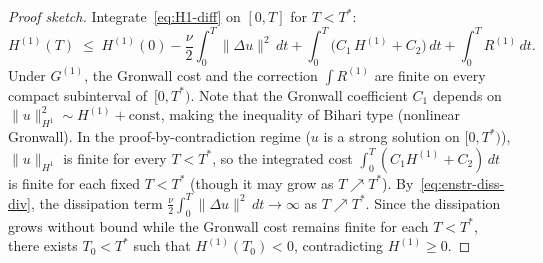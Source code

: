 \documentclass[12pt,a4paper]{article}
\theoremstyle{definition}
\theoremstyle{plain}
\theoremstyle{remark}
\begin{document}
\begin{proof}[Proof sketch]
Integrate~\eqref{eq:H1-diff} on $[0,T]$ for $T < T^*$:
\[
  H^{(1)}(T)
  \;\le\;
  H^{(1)}(0)
  - \frac{\nu}{2}\int_0^T\|\Delta u\|^2\,dt
  + \int_0^T\!\bigl(C_1\, H^{(1)} + C_2\bigr)\,dt
  + \int_0^T R^{(1)}\,dt.
\]
Under $G^{(1)}$, the Gronwall cost and the correction $\int R^{(1)}$
are finite on every compact subinterval of~$[0,T^*)$.
Note that the Gronwall coefficient $C_1$ depends on
$\|u\|_{H^1}^2 \sim H^{(1)} + \mathrm{const}$, making the
inequality of Bihari type (nonlinear Gronwall).  In the
proof-by-contradiction regime ($u$ is a strong solution on $[0,T^*)$),
$\|u\|_{H^1}$ is finite for every $T < T^*$, so the integrated cost
$\int_0^T(C_1 H^{(1)} + C_2)\,dt$ is finite for each fixed $T < T^*$
(though it may grow as $T \nearrow T^*$).
By~\eqref{eq:enstr-diss-div}, the dissipation term
$\frac{\nu}{2}\int_0^T\|\Delta u\|^2\,dt \to \infty$ as $T \nearrow T^*$.
Since the dissipation grows without bound while the Gronwall cost remains
finite for each $T < T^*$, there exists $T_0 < T^*$ such that
$H^{(1)}(T_0) < 0$, contradicting $H^{(1)} \ge 0$.
\end{proof}
\end{document}
